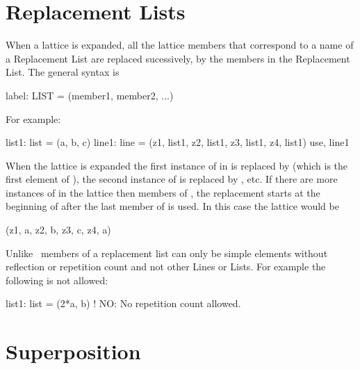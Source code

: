 \section{Replacement Lists}

When a lattice is expanded, all the lattice members that correspond to a name of a Replacement List 
are replaced sucessively, by the members
in the Replacement List. The general syntax is
\begin{example}
  label: LIST = (member1, member2, ...)
\end{example}
For example:
\begin{example}
  list1: list = (a, b, c)
  line1: line = (z1, list1, z2, list1, z3, list1, z4, list1)
  use, line1
\end{example}
When the lattice is expanded the first instance of  in  is replaced by  
(which is the first element of ), the second instance of  is replaced by ,
etc. If there are more instances of  in the lattice then members of ,
the replacement starts at the beginning of  after the last member of  is used.
In this case the lattice would be
\begin{example}
  (z1, a, z2, b, z3, c, z4, a)
\end{example}
Unlike \mad\, members of a replacement list can only be simple elements without reflection or repetition count and not other Lines or Lists. For example the following is not allowed:
\begin{example}
  list1: list = (2*a, b)  ! NO: No repetition count allowed.
\end{example}

\section{Superposition}
\label{s:super}

